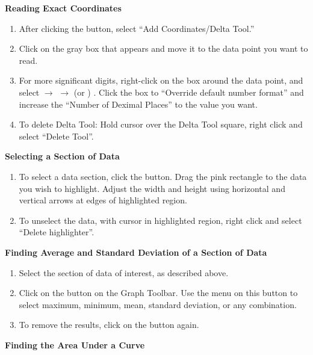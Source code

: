 \textbf{Reading Exact Coordinates}
\begin{enumerate}
\item After clicking the  button, select ``Add Coordinates/Delta Tool.''

\item Click on the gray box that appears and move it to the data point you want to read.

\item For more significant digits, right-click on the box around the data point, and select  $\rightarrow$  $\rightarrow$  (or ) .  Click the box to ``Override default number format'' and increase the ``Number of Deximal Places'' to the value you want.

\item To delete Delta Tool: Hold cursor over the Delta Tool square, right click and select ``Delete Tool''.

\end{enumerate}


\vspace{5mm}
\textbf{Selecting a Section of Data}

\begin{enumerate}
\item To select a data section, click the  button.  Drag the pink rectangle to the data you wish to highlight.  Adjust the width and height using horizontal and vertical arrows at edges of highlighted region.
\item To unselect the data, with cursor in highlighted region, right click and select ``Delete highlighter''.
\end{enumerate}
\vspace{5mm}
\textbf{Finding Average and Standard Deviation of a Section of Data}

\begin{enumerate}
\item Select the section of data of interest, as described above.
\item Click on the  button on the Graph Toolbar. Use the menu on this button to select maximum, minimum, mean, standard deviation, or any combination.
\item To remove the results, click on the  button again.
\end{enumerate}


\pagebreak[2]
\vspace{5mm}
\textbf{Finding the Area Under a Curve}

